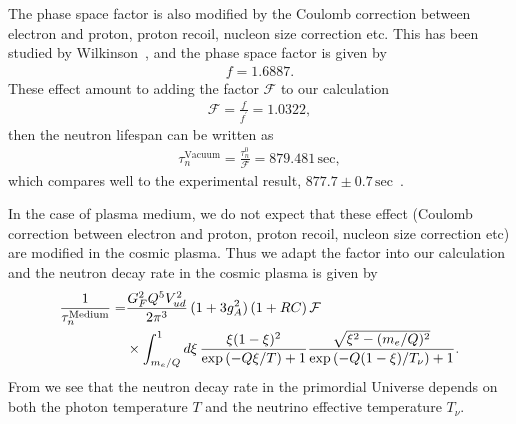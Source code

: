 The phase space factor is also modified by the Coulomb correction between electron and proton, proton recoil, nucleon size correction etc. This has been studied by Wilkinson~\cite{Wilkinson:1982hu}, and the phase space factor is given by~\cite{Czarnecki:2018okw,Czarnecki:2004cw,Wilkinson:1982hu}
\begin{align}
f=1.6887.
\end{align}
These effect amount to adding the factor $\mathcal{F}$ to our calculation
\begin{align}
\mathcal{F}=\frac{f}{f^\prime}=1.0322,
\end{align}
then the neutron lifespan can be written as 
\begin{align}
\tau^{\mathrm{Vacuum}}_n=\frac{\tau^0_n}{\mathcal{F}}=879.481\,\mathrm{sec},
\end{align}
which compares well to the experimental result, $877.7\pm0.7\,\mathrm{sec}$~\cite{Pattie:2017vsj}. 

In the case of plasma medium, we do not expect that these effect (Coulomb correction between electron and proton, proton recoil, nucleon size correction etc) are modified in the cosmic plasma. Thus we adapt the factor into our calculation and the neutron decay rate in the cosmic plasma is given by
\begin{align}
\label{Decay_rate_02}
\frac{1}{\tau_n^{\mathrm{Medium}}}=&\frac{G^2_FQ^5V^2_{ud}}{2\pi^3}\,(1+3g^2_A)\,(1+RC)\,\mathcal{F}\\
&\times\int^1_{m_e/Q}d\xi\,\frac{\xi(1-\xi)^2}{\exp\left(-Q\xi/{T}\right)+1}\frac{\sqrt{\xi^2-(m_e/Q)^2}}{\exp\left(-Q(1-\xi)/T_\nu\right)+1}.\notag
\end{align}
From  we see that the neutron decay rate in the primordial Universe depends on both the photon temperature $T$ and the neutrino effective temperature $T_\nu$.

